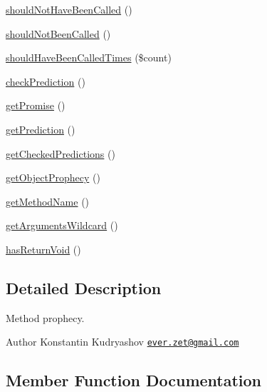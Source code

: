 \begin{DoxyCompactItemize}
\mbox{\hyperlink{class_prophecy_1_1_prophecy_1_1_method_prophecy_a4e6087eab8bb2523b296a26f6e0338c3}{should\+Not\+Have\+Been\+Called}} ()
\item 
\mbox{\hyperlink{class_prophecy_1_1_prophecy_1_1_method_prophecy_a1fc42bf59d2990ffb95625672b6128db}{should\+Not\+Been\+Called}} ()
\item 
\mbox{\hyperlink{class_prophecy_1_1_prophecy_1_1_method_prophecy_a6b59d09c89d558513ee39715526205fd}{should\+Have\+Been\+Called\+Times}} (\$count)
\item 
\mbox{\hyperlink{class_prophecy_1_1_prophecy_1_1_method_prophecy_a6208832c7981878e1d86053436f90ca2}{check\+Prediction}} ()
\item 
\mbox{\hyperlink{class_prophecy_1_1_prophecy_1_1_method_prophecy_a9afd2e35be9e87f7d14be57a48c230e3}{get\+Promise}} ()
\item 
\mbox{\hyperlink{class_prophecy_1_1_prophecy_1_1_method_prophecy_a7aed5954f9cccc6c713e440af1820a5b}{get\+Prediction}} ()
\item 
\mbox{\hyperlink{class_prophecy_1_1_prophecy_1_1_method_prophecy_a1e9933ecc793e75a985ea15acad84e58}{get\+Checked\+Predictions}} ()
\item 
\mbox{\hyperlink{class_prophecy_1_1_prophecy_1_1_method_prophecy_a1cff2ecad65e616019de966935f0fe94}{get\+Object\+Prophecy}} ()
\item 
\mbox{\hyperlink{class_prophecy_1_1_prophecy_1_1_method_prophecy_a0fa2079426d0262e759c4105fa4e9163}{get\+Method\+Name}} ()
\item 
\mbox{\hyperlink{class_prophecy_1_1_prophecy_1_1_method_prophecy_a5c97b67313b7e17d0a79997c0f116957}{get\+Arguments\+Wildcard}} ()
\item 
\mbox{\hyperlink{class_prophecy_1_1_prophecy_1_1_method_prophecy_a2c153ad0fb7d39474ee61d8ee918ec46}{has\+Return\+Void}} ()
\end{DoxyCompactItemize}


\subsection{Detailed Description}
Method prophecy.

\begin{DoxyAuthor}{Author}
Konstantin Kudryashov \href{mailto:ever.zet@gmail.com}{\tt ever.\+zet@gmail.\+com} 
\end{DoxyAuthor}


\subsection{Member Function Documentation}
\mbox{\label{class_prophecy_1_1_prophecy_1_1_method_prophecy_a6208832c7981878e1d86053436f90ca2}} 
